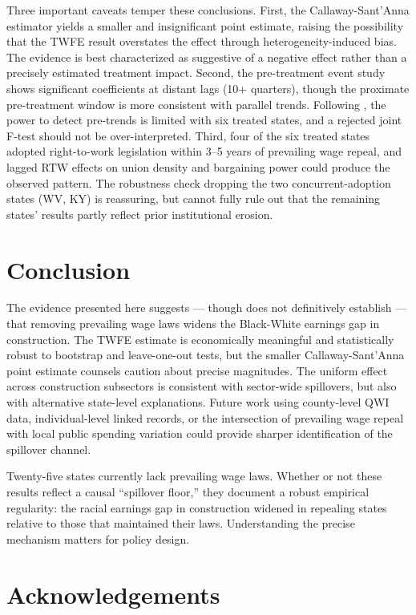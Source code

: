 \documentclass[12pt]{article}
\begin{document}
Three important caveats temper these conclusions. First, the Callaway-Sant'Anna estimator yields a smaller and insignificant point estimate, raising the possibility that the TWFE result overstates the effect through heterogeneity-induced bias. The evidence is best characterized as suggestive of a negative effect rather than a precisely estimated treatment impact. Second, the pre-treatment event study shows significant coefficients at distant lags (10+ quarters), though the proximate pre-treatment window is more consistent with parallel trends. Following \citet{roth2022pretest}, the power to detect pre-trends is limited with six treated states, and a rejected joint F-test should not be over-interpreted. Third, four of the six treated states adopted right-to-work legislation within 3--5 years of prevailing wage repeal, and lagged RTW effects on union density and bargaining power could produce the observed pattern. The robustness check dropping the two concurrent-adoption states (WV, KY) is reassuring, but cannot fully rule out that the remaining states' results partly reflect prior institutional erosion.


\section{Conclusion}

The evidence presented here suggests --- though does not definitively establish --- that removing prevailing wage laws widens the Black-White earnings gap in construction. The TWFE estimate is economically meaningful and statistically robust to bootstrap and leave-one-out tests, but the smaller Callaway-Sant'Anna point estimate counsels caution about precise magnitudes. The uniform effect across construction subsectors is consistent with sector-wide spillovers, but also with alternative state-level explanations. Future work using county-level QWI data, individual-level linked records, or the intersection of prevailing wage repeal with local public spending variation could provide sharper identification of the spillover channel.

Twenty-five states currently lack prevailing wage laws. Whether or not these results reflect a causal ``spillover floor,'' they document a robust empirical regularity: the racial earnings gap in construction widened in repealing states relative to those that maintained their laws. Understanding the precise mechanism matters for policy design.

\section*{Acknowledgements}
\end{document}
